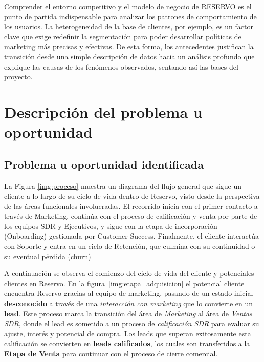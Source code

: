 Comprender el entorno competitivo y el modelo de negocio de RESERVO es el punto de partida indispensable para analizar los patrones de comportamiento de los usuarios. La heterogeneidad de la base de clientes, por ejemplo, es un factor clave que exige redefinir la segmentación para poder desarrollar políticas de marketing más precisas y efectivas. De esta forma, los antecedentes justifican la transición desde una simple descripción de datos hacia un análisis profundo que explique las causas de los fenómenos observados, sentando así las bases del proyecto.

\section{Descripción del problema u oportunidad}

\subsection{Problema u oportunidad identificada}


La Figura \ref{img:proceso} muestra un diagrama del flujo general que sigue un cliente a lo largo de su ciclo de vida dentro de Reservo, visto desde la perspectiva de las áreas funcionales involucradas. El recorrido inicia con el primer contacto a través de Marketing, continúa con el proceso de calificación y venta por parte de los equipos SDR y Ejecutivos, y sigue con la etapa de incorporación (Onboarding) gestionada por Customer Success. Finalmente, el cliente interactúa con Soporte y entra en un ciclo de Retención, que culmina con su continuidad o su eventual pérdida (churn)


A continuación se observa el comienzo del ciclo de vida del cliente y potenciales clientes en Reservo. En la figura~\ref{img:etapa_adquisicion} el potencial cliente encuentra Reservo gracias al equipo de marketing, pasando de un estado inicial \textbf{desconocido} a través de una \textit{interacción con marketing} que lo convierte en un \textbf{lead}. Este proceso marca la transición del área de \textit{Marketing} al área de \textit{Ventas SDR}, donde el lead es sometido a un proceso de \textit{calificación SDR} para evaluar su ajuste, interés y potencial de compra. Los leads que superan exitosamente esta calificación se convierten en \textbf{leads calificados}, los cuales son transferidos a la \textbf{Etapa de Venta} para continuar con el proceso de cierre comercial.

